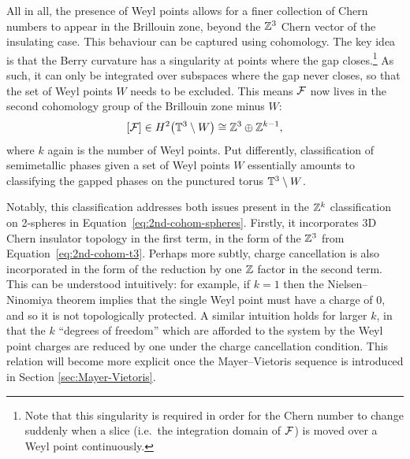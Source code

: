 All in all, the presence of Weyl points allows for a finer collection of Chern numbers to appear in the Brillouin zone, beyond the $\mathbb{Z}^3$ Chern vector of the insulating case. This behaviour can be captured using cohomology. The key idea is that the Berry curvature has a singularity at points where the gap closes.\footnote{
	Note that this singularity is required in order for the Chern number to change suddenly when a slice (i.e.\ the integration domain of $\mathcal{F}$) is moved over a Weyl point continuously.}
As such, it can only be integrated over subspaces where the gap never closes, so that the set of Weyl points $W$ needs to be excluded. This means $\mathcal{F}$ now lives in the second cohomology group of the Brillouin zone minus $W$:
\begin{equation}\label{eq:2nd-cohom-semimetal}
	[\mathcal{F}]\in H^2\big(\mathbb{T}^3\setminus W\big) \cong \mathbb{Z}^3\oplus\mathbb{Z}^{k-1},
\end{equation}
where $k$ again is the number of Weyl points. Put differently, classification of semimetallic phases given a set of Weyl points $W$ essentially amounts to classifying the gapped phases on the punctured torus $\mathbb{T}^3\setminus W$.

Notably, this classification addresses both issues present in the $\mathbb{Z}^k$ classification on 2-spheres in Equation~\eqref{eq:2nd-cohom-spheres}. Firstly, it incorporates 3D Chern insulator topology in the first term, in the form of the $\mathbb{Z}^3$ from Equation~\eqref{eq:2nd-cohom-t3}. Perhaps more subtly, charge cancellation is also incorporated in the form of the reduction by one $\mathbb{Z}$ factor in the second term. This can be understood intuitively: for example, if $k=1$ then the Nielsen--Ninomiya theorem implies that the single Weyl point must have a charge of 0, and so it is not topologically protected. A similar intuition holds for larger $k$, in that the $k$ ``degrees of freedom'' which are afforded to the system by the Weyl point charges are reduced by one under the charge cancellation condition. %
This relation will become more explicit once the Mayer--Vietoris sequence is introduced in Section \ref{sec:Mayer-Vietoris}.



